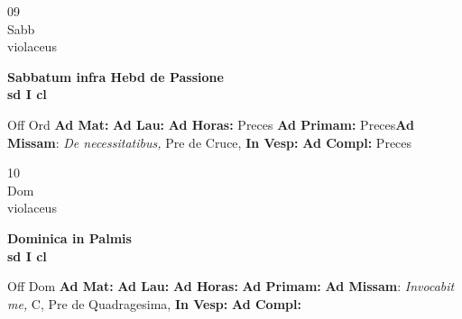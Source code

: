 \documentclass[10pt, openany]{book}
\begin{document}
    \begin{center}
        \begin{minipage}{3.5in}
            \vspace{2em}
            \begin{minipage}{0.5in}
                {\Huge 09} \\
                {\normalsize Sabb} \\
                {\normalsize violaceus}
            \end{minipage}
            \begin{minipage}{3.0in}
                \textbf{ \large Sabbatum infra Hebd de Passione \\
                \textnormal{\normalsize sd I cl}} \\ 
            \end{minipage}
            \begin{justify}Off Ord
                \textbf{Ad Mat: }
                \textbf{Ad Lau: }
                \textbf{Ad Horas: }Preces
                \textbf{Ad Primam: }Preces\textbf{Ad Missam}: \textit{De necessitatibus,} Pre de Cruce,  
                \textbf{In Vesp: }
                \textbf{Ad Compl: }Preces
            \end{justify}
        \end{minipage}
    \end{center}

    \begin{center}
        \begin{minipage}{3.5in}
            \vspace{2em}
            \begin{minipage}{0.5in}
                {\Huge 10} \\
                {\normalsize Dom} \\
                {\normalsize violaceus}
            \end{minipage}
            \begin{minipage}{3.0in}
                \textbf{ \large Dominica in Palmis \\
                \textnormal{\normalsize sd I cl}} \\ 
            \end{minipage}
            \begin{justify}Off Dom
                \textbf{Ad Mat: }
                \textbf{Ad Lau: }
                \textbf{Ad Horas: }
                \textbf{Ad Primam: }\textbf{Ad Missam}: \textit{Invocabit me,} C, Pre de Quadragesima,  
                \textbf{In Vesp: }
                \textbf{Ad Compl: }
            \end{justify}
        \end{minipage}
    \end{center}
\end{document}
